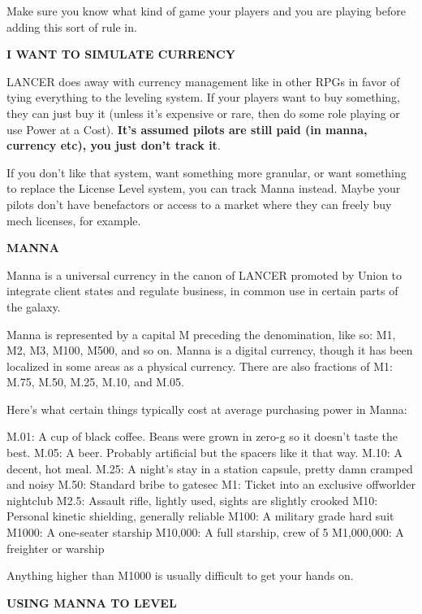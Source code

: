 Make sure you know what kind of game your players and you are playing before adding this sort
of rule in.

\begin{center}
    \textbf{I WANT TO SIMULATE CURRENCY}
\end{center}

LANCER does away with currency management like in other RPGs in favor of tying everything to
the leveling system. If your players want to buy something, they can just buy it (unless it’s
expensive or rare, then do some role playing or use Power at a Cost). \textbf{It’s assumed pilots are
still paid (in manna, currency etc), you just don’t track it}.

If you don’t like that system, want something more granular, or want something to replace the
License Level system, you can track Manna instead. Maybe your pilots don’t have benefactors or
access to a market where they can freely buy mech licenses, for example.

\begin{center}
    \textbf{MANNA}
\end{center}

Manna is a universal currency in the canon of LANCER promoted by Union to integrate client
states and regulate business, in common use in certain parts of the galaxy.

Manna is represented by a capital M preceding the denomination, like so: M1, M2, M3, M100,
M500, and so on. Manna is a digital currency, though it has been localized in some areas as a
physical currency. There are also fractions of M1: M.75, M.50, M.25, M.10, and M.05.

Here’s what certain things typically cost at average purchasing power in Manna:

M.01: A cup of black coffee. Beans were grown in zero-g so it doesn’t taste the best.
M.05: A beer. Probably artificial but the spacers like it that way.
M.10: A decent, hot meal.
M.25: A night’s stay in a station capsule, pretty damn cramped and noisy
M.50: Standard bribe to gatesec
M1: Ticket into an exclusive offworlder nightclub
M2.5: Assault rifle, lightly used, sights are slightly crooked
M10: Personal kinetic shielding, generally reliable
M100: A military grade hard suit
M1000: A one-seater starship
M10,000: A full starship, crew of 5
M1,000,000: A freighter or warship

Anything higher than M1000 is usually difficult to get your hands on.

\begin{center}
    \textbf{USING MANNA TO LEVEL}
\end{center}

